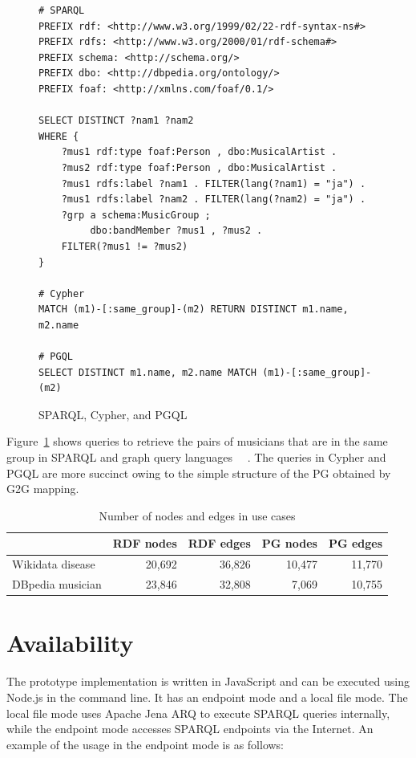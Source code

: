 \documentclass[runningheads]{llncs}
\begin{document}
\begin{figure}[!t]
\vspace{2mm}
\begin{scriptsize}
\begin{verbatim}
# SPARQL
PREFIX rdf: <http://www.w3.org/1999/02/22-rdf-syntax-ns#>
PREFIX rdfs: <http://www.w3.org/2000/01/rdf-schema#>
PREFIX schema: <http://schema.org/>
PREFIX dbo: <http://dbpedia.org/ontology/>
PREFIX foaf: <http://xmlns.com/foaf/0.1/>
 
SELECT DISTINCT ?nam1 ?nam2
WHERE {
    ?mus1 rdf:type foaf:Person , dbo:MusicalArtist .
    ?mus2 rdf:type foaf:Person , dbo:MusicalArtist .
    ?mus1 rdfs:label ?nam1 . FILTER(lang(?nam1) = "ja") .
    ?mus1 rdfs:label ?nam2 . FILTER(lang(?nam2) = "ja") .
    ?grp a schema:MusicGroup ;
         dbo:bandMember ?mus1 , ?mus2 .
    FILTER(?mus1 != ?mus2)
}

# Cypher
MATCH (m1)-[:same_group]-(m2) RETURN DISTINCT m1.name, m2.name

# PGQL
SELECT DISTINCT m1.name, m2.name MATCH (m1)-[:same_group]-(m2)
\end{verbatim}
\end{scriptsize}
\caption{SPARQL, Cypher, and PGQL}
\label{fig:sparql}
\end{figure}
 
Figure~\ref{fig:sparql} shows queries to retrieve the pairs of musicians that are in the same group in SPARQL and graph query languages ~\cite{openCypher}~\cite{pgql}. The queries in Cypher and PGQL are more succinct owing to the simple structure of the PG obtained by G2G mapping.

\begin{table}[h]
    \centering
    \begin{tabular}{l|r|r|r|r}
        \hline
        & RDF nodes & RDF edges & PG nodes & PG edges \\
        \hline
        Wikidata disease & 20,692 & 36,826 & 10,477 & 11,770 \\
        DBpedia musician & 23,846 & 32,808 & 7,069 & 10,755 \\
        \hline
    \end{tabular}
    \caption{Number of nodes and edges in use cases}
    \label{table:numbers}
\end{table}


\section{Availability}
The prototype implementation is written in JavaScript and can be executed using Node.js in the command line. It has an endpoint mode and a local file mode. The local file mode uses Apache Jena ARQ to execute SPARQL queries internally, while the endpoint mode accesses SPARQL endpoints via the Internet. An example of the usage in the endpoint mode is as follows:
\end{document}
